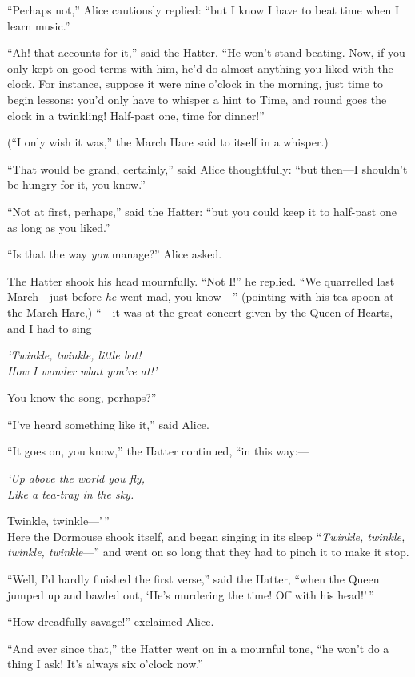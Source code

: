 \documentclass[book, 20pt]{extbook}
\begin{document}
``Perhaps not,'' Alice cautiously replied: ``but I know I have to beat
time when I learn music.''

``Ah! that accounts for it,'' said the Hatter. ``He won't stand beating.
Now, if you only kept on good terms with him, he'd do almost anything
you liked with the clock. For instance, suppose it were nine o'clock in
the morning, just time to begin lessons: you'd only have to whisper a
hint to Time, and round goes the clock in a twinkling! Half-past one,
time for dinner!''

(``I only wish it was,'' the March Hare said to itself in a whisper.)

``That would be grand, certainly,'' said Alice thoughtfully: ``but
then---I shouldn't be hungry for it, you know.''

``Not at first, perhaps,'' said the Hatter: ``but you could keep it to
half-past one as long as you liked.''

``Is that the way \emph{you} manage?'' Alice asked.

The Hatter shook his head mournfully. ``Not I!'' he replied. ``We
quarrelled last March---just before \emph{he} went mad, you know---''
(pointing with his tea spoon at the March Hare,) ``---it was at the
great concert given by the Queen of Hearts, and I had to sing\\
\bigskip
{\centering
\emph{`Twinkle, twinkle, little bat!\\
How I wonder what you're at!'}\par}
\bigskip
You know the song, perhaps?''

``I've heard something like it,'' said Alice.

``It goes on, you know,'' the Hatter continued, ``in this way:---\\
\bigskip
{\centering
\emph{`Up above the world you fly,\\
Like a tea-tray in the sky.}\par}
\hfill {Twinkle, twinkle---'\,''\\}
\bigskip
Here the Dormouse shook itself, and began singing in its sleep
``\emph{Twinkle, twinkle, twinkle, twinkle}---'' and went on so long
that they had to pinch it to make it stop.

``Well, I'd hardly finished the first verse,'' said the Hatter, ``when
the Queen jumped up and bawled out, `He's murdering the time! Off with
his head!'\,''

``How dreadfully savage!'' exclaimed Alice.

``And ever since that,'' the Hatter went on in a mournful tone, ``he
won't do a thing I ask! It's always six o'clock now.''
\end{document}
